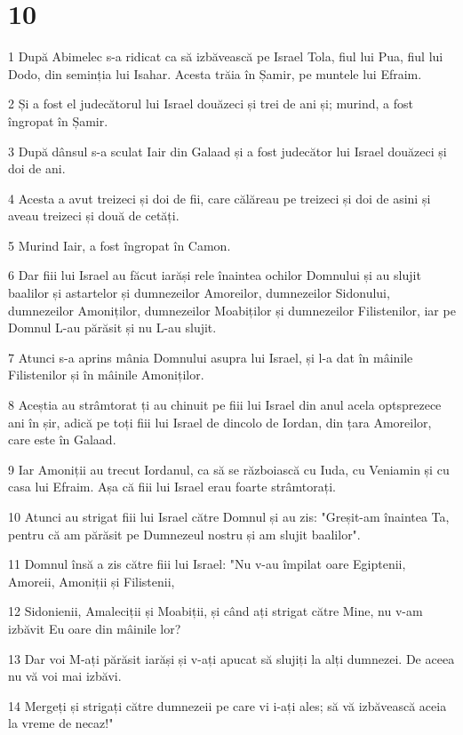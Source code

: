 \chapter{10}

\par 1 După Abimelec s-a ridicat ca să izbăvească pe Israel Tola, fiul lui Pua, fiul lui Dodo, din seminția lui Isahar. Acesta trăia în Șamir, pe muntele lui Efraim.
\par 2 Și a fost el judecătorul lui Israel douăzeci și trei de ani și; murind, a fost îngropat în Șamir.
\par 3 După dânsul s-a sculat Iair din Galaad și a fost judecător lui Israel douăzeci și doi de ani.
\par 4 Acesta a avut treizeci și doi de fii, care călăreau pe treizeci și doi de asini și aveau treizeci și două de cetăți.
\par 5 Murind Iair, a fost îngropat în Camon.
\par 6 Dar fiii lui Israel au făcut iarăși rele înaintea ochilor Domnului și au slujit baalilor și astartelor și dumnezeilor Amoreilor, dumnezeilor Sidonului, dumnezeilor Amoniților, dumnezeilor Moabiților și dumnezeilor Filistenilor, iar pe Domnul L-au părăsit și nu L-au slujit.
\par 7 Atunci s-a aprins mânia Domnului asupra lui Israel, și l-a dat în mâinile Filistenilor și în mâinile Amoniților.
\par 8 Aceștia au strâmtorat ți au chinuit pe fiii lui Israel din anul acela optsprezece ani în șir, adică pe toți fiii lui Israel de dincolo de Iordan, din țara Amoreilor, care este în Galaad.
\par 9 Iar Amoniții au trecut Iordanul, ca să se războiască cu Iuda, cu Veniamin și cu casa lui Efraim. Așa că fiii lui Israel erau foarte strâmtorați.
\par 10 Atunci au strigat fiii lui Israel către Domnul și au zis: "Greșit-am înaintea Ta, pentru că am părăsit pe Dumnezeul nostru și am slujit baalilor".
\par 11 Domnul însă a zis către fiii lui Israel: "Nu v-au împilat oare Egiptenii, Amoreii, Amoniții și Filistenii,
\par 12 Sidonienii, Amaleciții și Moabiții, și când ați strigat către Mine, nu v-am izbăvit Eu oare din mâinile lor?
\par 13 Dar voi M-ați părăsit iarăși și v-ați apucat să slujiți la alți dumnezei. De aceea nu vă voi mai izbăvi.
\par 14 Mergeți și strigați către dumnezeii pe care vi i-ați ales; să vă izbăvească aceia la vreme de necaz!"
